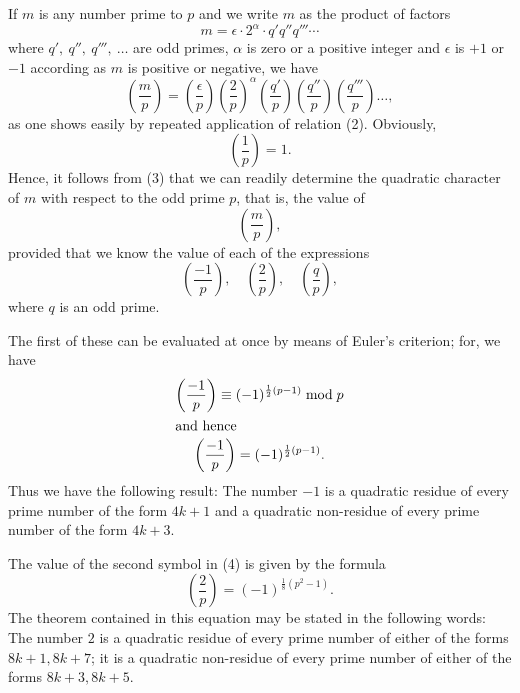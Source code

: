 \documentclass[oneside]{book}
\begin{document}
If $m$ is any number prime to $p$ and we write $m$ as the product of
factors
\begin{equation*}
m = \epsilon \cdot 2^\alpha \cdot q' q'' q''' \cdots
\end{equation*}
where $q',\ q'',\ q''',\ \ldots$ are odd primes, $\alpha$ is zero or
a positive integer and $\epsilon$ is $+1$ or $-1$ according as $m$
is positive or negative, we have
\begin{equation}
\left( \frac{m}{p} \right ) =
\left( \frac{\epsilon}{p} \right )
\left( \frac{2}{p} \right ) ^\alpha
\left( \frac{q'}{p} \right )
\left( \frac{q''}{p} \right )
\left( \frac{q'''}{p} \right ) \ldots, \tag{3}
\end{equation}
as one shows easily by repeated application of relation (2).
Obviously,
\begin{equation*}
\left( \frac{1}{p} \right ) = 1.
\end{equation*}
Hence, it follows from (3) that we can readily determine the
quadratic character of $m$ with respect to the odd prime $p$, that
is, the value of
\begin{equation*}
\left( \frac{m}{p} \right ),
\end{equation*}
provided that we know the value of each of the expressions
\begin{equation}
\left( \frac{-1}{p}  \right ),\quad
  \left( \frac{2}{p} \right ),\quad
  \left( \frac{q}{p} \right ),\tag{4}
\end{equation}
where $q$ is an odd prime.

The first of these can be evaluated at once by means of Euler's
criterion; for, we have
\begin{gather*}
\left( \frac{-1}{p} \right ) \equiv
  (-1)^{\frac{1}{2} (p-1)} \bmod p \\
\intertext{and hence}
\left( \frac{-1}{p} \right ) = (-1)^{\frac{1}{2} (p-1)}.
\end{gather*}
Thus we have the following result: The number $-1$ is a quadratic
residue of every prime number of the form $4k + 1$ and a quadratic
non-residue of every prime number of the form $4k + 3$.

The value of the second symbol in (4) is given by the formula
\begin{equation*}
\left( \frac{2}{p} \right ) = (-1)^{\frac{1}{8} (p^2 -1)}.
\end{equation*}
The theorem contained in this equation may be stated in the
following words: The number $2$ is a quadratic residue of every
prime number of either of the forms $8k + 1, 8k + 7$; it is a
quadratic non-residue of every prime number of either of the forms
$8k + 3, 8k + 5$.
\end{document}
